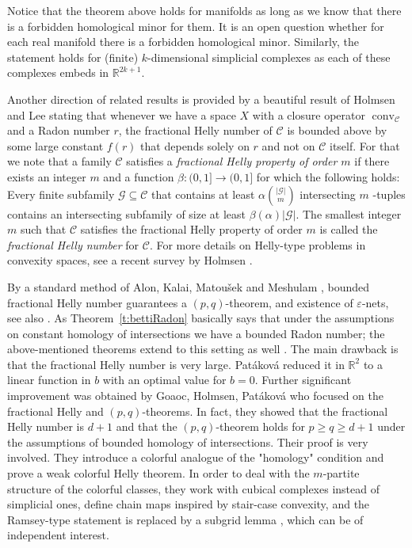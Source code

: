 \documentclass[a4paper,12pt]{amsart}
\newcommand{\R}{\mathbb{R}} 	%
\DeclareMathOperator{\conv}{conv}
\theoremstyle{definition}
\begin{document}
Notice that the theorem above holds for manifolds as long as we know that there is a forbidden homological minor for them. It is an open question whether for each real manifold there is a forbidden homological minor. 
Similarly, the statement holds for (finite) $k$-dimensional simplicial complexes as each of these complexes embeds in $\R^{2k+1}$. 

Another direction of related results is provided by a beautiful result of Holmsen and Lee \cite{boundedRadon_fractHelly} stating that whenever we have a space $X$ with a closure operator $\conv_\mathcal C$ and a Radon number $r$, the fractional Helly number of $\mathcal C$ is bounded above by some large constant $f(r)$ that depends solely on $r$ and not on $\mathcal C$ itself. For that we note that a family $\mathcal C$ satisfies a \emph{fractional Helly property of order $m$} if there exists
an integer $m$ and a function $\beta: (0,1] \to (0,1]$ for which
the following holds:
Every finite subfamily $\mathcal G \subseteq \mathcal C$ that contains at least $\alpha \binom{|\mathcal G|}{m}$ intersecting $m$ -tuples
contains an intersecting subfamily of size at least $\beta(\alpha)|\mathcal G|$. The smallest integer $m$ such that $\mathcal C$ satisfies the fractional Helly property of order $m$ is called
the \emph{fractional Helly number} for $\mathcal C$. For more details on Helly-type problems in convexity spaces, see a recent survey by Holmsen \cite{holmsen-survey}.

By a standard method of Alon, Kalai, Matoušek and Meshulam \cite{transversal-hypergraph}, bounded fractional Helly number guarantees a $(p,q)$-theorem, and existence of $\varepsilon$-nets, see also  \cite{boundedRadon_fractHelly}. As Theorem~\ref{t:bettiRadon} basically says that under the assumptions on constant homology of intersections we have a bounded Radon number; the above-mentioned theorems extend to this setting as well \cite{boundedRadon_fractHelly, bettiRadon}.  
The main drawback is that the fractional Helly number is very large. Patáková \cite{bettiRadon} reduced it in $\R^2$ to a linear function in $b$ with an optimal value for $b=0$. Further significant improvement was obtained by Goaoc, Holmsen, Patáková \cite{goaoc2024intersectionpatternsspacesforbidden} who focused on the fractional Helly and $(p,q)$-theorems. In fact, they showed that the fractional Helly number is $d+1$ and that the $(p,q)$-theorem holds for $p\geq q\geq d+1$ under the assumptions of bounded homology of intersections.
Their proof is very involved. They introduce a colorful analogue of the "homology" condition and prove a weak colorful Helly theorem. In order to deal with the $m$-partite structure of the colorful classes, they work with cubical complexes instead of simplicial ones, define chain maps inspired by stair-case convexity, and the Ramsey-type statement is replaced by a subgrid lemma \cite[Prop. 4.1]{goaoc2024intersectionpatternsspacesforbidden}, which can be of independent interest.
\end{document}
